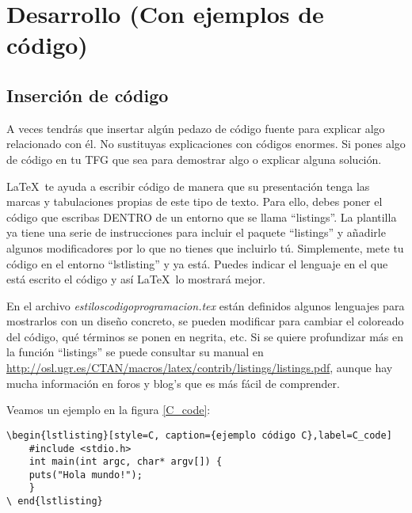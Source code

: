 
\chapter{Desarrollo (Con ejemplos de código)}
\label{desarrollo}

\section{Inserción de código}
A veces tendrás que insertar algún pedazo de código fuente para explicar algo relacionado con él. No sustituyas explicaciones con códigos enormes. Si pones algo de código en tu TFG que sea para demostrar algo o explicar alguna solución.

\LaTeX~te ayuda a escribir código de manera que su presentación tenga las marcas y tabulaciones propias de este tipo de texto. Para ello, debes poner el código que escribas DENTRO de un entorno  que se llama ``listings''.  La plantilla ya tiene una serie de instrucciones para incluir el paquete ``listings'' y añadirle algunos modificadores por lo que no tienes que incluirlo tú. Simplemente, mete tu código en el entorno ``lstlisting'' y ya está. Puedes indicar el lenguaje en el que está escrito el código y así \LaTeX~lo mostrará mejor. 
\\
\par En el archivo \textit{estiloscodigoprogramacion.tex} están definidos algunos lenguajes para mostrarlos con un diseño concreto, se pueden modificar para cambiar el coloreado del código, qué términos se ponen en negrita, etc.
Si se quiere profundizar más en la función ``listings'' se puede consultar su manual en \url{http://osl.ugr.es/CTAN/macros/latex/contrib/listings/listings.pdf}, aunque hay mucha información en foros y blog's que es más fácil de comprender.

\par Veamos un ejemplo en la figura \ref{C_code}:

\begin{lstlisting}[style=Latex-color]
\begin{lstlisting}[style=C, caption={ejemplo código C},label=C_code]
	#include <stdio.h>
	int main(int argc, char* argv[]) {
  	puts("Hola mundo!");
	}
\ end{lstlisting}	
\end{lstlisting}

